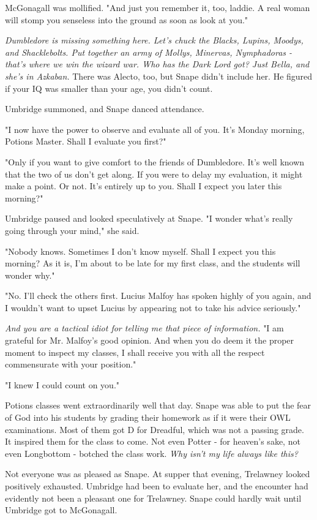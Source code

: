 \documentclass[a4paper,11pt]{article}
\begin{document}
McGonagall was mollified. "And just you remember it, too, laddie. A real woman will stomp you senseless into the ground as soon as look at you."

\emph{Dumbledore is missing something here. Let's chuck the Blacks, Lupins, Moodys, and Shacklebolts. Put together an army of Mollys, Minervas, Nymphadoras - that's where we win the wizard war. Who has the Dark Lord got? Just Bella, and she's in Azkaban.} There was Alecto, too, but Snape didn't include her. He figured if your IQ was smaller than your age, you didn't count.

Umbridge summoned, and Snape danced attendance.

"I now have the power to observe and evaluate all of you. It's Monday morning, Potions Master. Shall I evaluate you first?"

"Only if you want to give comfort to the friends of Dumbledore. It's well known that the two of us don't get along. If you were to delay my evaluation, it might make a point. Or not. It's entirely up to you. Shall I expect you later this morning?"

Umbridge paused and looked speculatively at Snape. "I wonder what's really going through your mind," she said.

"Nobody knows. Sometimes I don't know myself. Shall I expect you this morning? As it is, I'm about to be late for my first class, and the students will wonder why."

"No. I'll check the others first. Lucius Malfoy has spoken highly of you again, and I wouldn't want to upset Lucius by appearing not to take his advice seriously."

\emph{And you are a tactical idiot for telling me that piece of information.} "I am grateful for Mr. Malfoy's good opinion. And when you do deem it the proper moment to inspect my classes, I shall receive you with all the respect commensurate with your position."

"I knew I could count on you."

Potions classes went extraordinarily well that day. Snape was able to put the fear of God into his students by grading their homework as if it were their OWL examinations. Most of them got D for Dreadful, which was not a passing grade. It inspired them for the class to come. Not even Potter - for heaven's sake, not even Longbottom - botched the class work. \emph{Why isn't my life always like this?}

Not everyone was as pleased as Snape. At supper that evening, Trelawney looked positively exhausted. Umbridge had been to evaluate her, and the encounter had evidently not been a pleasant one for Trelawney. Snape could hardly wait until Umbridge got to McGonagall.
\end{document}
